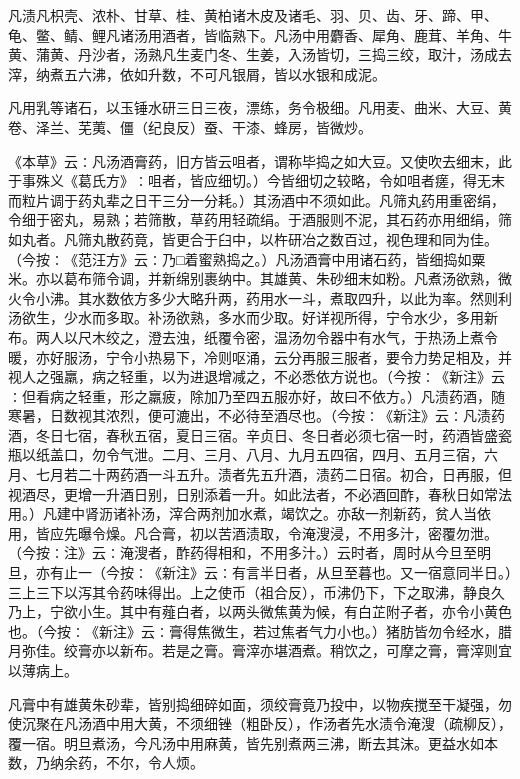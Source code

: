 \documentclass[a4paper,12pt,UTF8,twoside]{ctexbook}
\begin{document}
凡渍凡枳壳、浓朴、甘草、桂、黄柏诸木皮及诸毛、羽、贝、齿、牙、蹄、甲、龟、鳖、鲭、鲤凡诸汤用酒者，皆临熟下。凡汤中用麝香、犀角、鹿茸、羊角、牛黄、蒲黄、丹沙者，汤熟凡生麦门冬、生姜，入汤皆切，三捣三绞，取汁，汤成去滓，纳煮五六沸，依如升数，不可凡银屑，皆以水银和成泥。

凡用乳等诸石，以玉锤水研三日三夜，漂练，务令极细。凡用麦、曲米、大豆、黄卷、泽兰、芜荑、僵（纪良反）蚕、干漆、蜂房，皆微炒。

《本草》云∶凡汤酒膏药，旧方皆云咀者，谓称毕捣之如大豆。又使吹去细末，此于事殊义《葛氏方》∶咀者，皆应细切。）今皆细切之较略，令如咀者瘥，得无末而粒片调于药丸辈之日干三分一分耗。）其汤酒中不须如此。凡筛丸药用重密绢，令细于密丸，易熟；若筛散，草药用轻疏绢。于酒服则不泥，其石药亦用细绢，筛如丸者。凡筛丸散药竟，皆更合于臼中，以杵研冶之数百过，视色理和同为佳。（今按∶《范汪方》云∶乃□着蜜熟捣之。）凡汤酒膏中用诸石药，皆细捣如粟米。亦以葛布筛令调，并新绵别裹纳中。其雄黄、朱砂细末如粉。凡煮汤欲熟，微火令小沸。其水数依方多少大略升两，药用水一斗，煮取四升，以此为率。然则利汤欲生，少水而多取。补汤欲熟，多水而少取。好详视所得，宁令水少，多用新布。两人以尺木绞之，澄去浊，纸覆令密，温汤勿令器中有水气，于热汤上煮令暖，亦好服汤，宁令小热易下，冷则呕涌，云分再服三服者，要令力势足相及，并视人之强羸，病之轻重，以为进退增减之，不必悉依方说也。（今按∶《新注》云∶但看病之轻重，形之羸疲，除加乃至四五服亦好，故曰不依方。）凡渍药酒，随寒暑，日数视其浓烈，便可漉出，不必待至酒尽也。（今按∶《新注》云∶凡渍药酒，冬日七宿，春秋五宿，夏日三宿。辛贞日、冬日者必须七宿一时，药酒皆盛瓷瓶以纸盖口，勿令气泄。二月、三月、八月、九月五四宿，四月、五月三宿，六月、七月若二十两药酒一斗五升。渍者先五升酒，渍药二日宿。初合，日再服，但视酒尽，更增一升酒日别，日别添着一升。如此法者，不必酒回酢，春秋日如常法用。）凡建中肾沥诸补汤，滓合两剂加水煮，竭饮之。亦敌一剂新药，贫人当依用，皆应先曝令燥。凡合膏，初以苦酒渍取，令淹溲浸，不用多汁，密覆勿泄。（今按∶注》云∶淹溲者，酢药得相和，不用多汁。）云时者，周时从今旦至明旦，亦有止一（今按∶《新注》云∶有言半日者，从旦至暮也。又一宿意同半日。）三上三下以泻其令药味得出。上之使币（祖合反），币沸仍下，下之取沸，静良久乃上，宁欲小生。其中有薤白者，以两头微焦黄为候，有白芷附子者，亦令小黄色也。（今按∶《新注》云∶膏得焦微生，若过焦者气力小也。）猪肪皆勿令经水，腊月弥佳。绞膏亦以新布。若是之膏。膏滓亦堪酒煮。稍饮之，可摩之膏，膏滓则宜以薄病上。

凡膏中有雄黄朱砂辈，皆别捣细碎如面，须绞膏竟乃投中，以物疾搅至干凝强，勿使沉聚在凡汤酒中用大黄，不须细锉（粗卧反），作汤者先水渍令淹溲（疏柳反），覆一宿。明旦煮汤，今凡汤中用麻黄，皆先别煮两三沸，断去其沫。更益水如本数，乃纳余药，不尔，令人烦。
\end{document}
